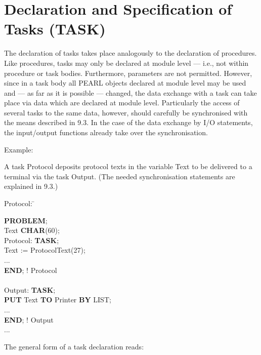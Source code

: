 \section{Declaration and Specification of Tasks (TASK)}   %

The declaration of tasks takes place analogously to the declaration of
procedures.
Like procedures, tasks may only be declared at
module level --- i.e., not within procedure or task bodies. Furthermore,
parameters are not permitted. However, since in a task body all PEARL
objects declared at module level may be used and --- as far as it is
possible --- changed, the data exchange with a task can take place via
data which are declared at module level. Particularly the access of
several tasks to the same data, however, should carefully be
synchronised with the means described in 9.3. In the case of the data 
exchange by I/O statements, the input/output functions
already take over the synchronisation.

Example:

A task Protocol deposits protocol texts in the variable Text to be
delivered to a terminal via the task Output. (The needed synchronisation
statements are explained in 9.3.)

\begin{tabbing}
\x Protocol: \= \kill

{\bf PROBLEM}; \> \\
 Text {\bf CHAR}(60); \> \\
\x Protocol: \> {\bf TASK}; \\
      \> Text := ProtocolText(27);\\
      \> ... \\
      \> {\bf END}; ! Protocol \\
      \> \\
\x Output:   \> {\bf TASK}; \\
      \> {\bf PUT} Text {\bf TO} Printer {\bf BY} LIST;\\
      \> ... \\
      \> {\bf END}; ! Output\\
\x ...       \>
\end{tabbing}

The general form of a task declaration reads:






